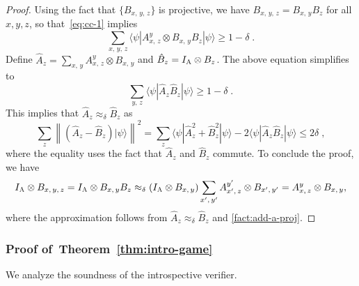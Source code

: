 \documentclass[11pt]{article}
\theoremstyle{definition}
\newcommand{\ket}[1]{|#1\rangle}
\newcommand{\bra}[1]{\langle#1|}
\newcommand{\Id}{\ensuremath{I}}
\newcommand{\ia}{\Id_\alice}
\newcommand{\norm}[1]{\left\| {#1} \right\|}
\newcommand{\labelstyle}[1]{\ensuremath{\textsc{#1}}\xspace}
\newcommand{\alice}{\labelstyle{A}}
\begin{document}
\begin{proof}
  Using the fact that $\{B_{x,\, y,\, z}\}$ is projective, we have $B_{x,\, y,\, z} =
  B_{x,\, y} B_z$ for all $x,y,z$, so that~\eqref{eq:cc-1} implies
  \begin{equation*}
    \sum_{x,\, y,\, z} \bra{\psi} A^y_{x,\, z} \otimes B_{x,\, y} B_{z}
    \ket{\psi} \ge 1 - \delta\;.
  \end{equation*}
  Define $\hat{A}_z = \sum_{x,\, y} A^y_{x,\, z} \otimes B_{x,\, y}$ and
  $\hat{B}_z = \ia \otimes B_z$.
  The above equation simplifies to
  \begin{equation*}
    \sum_{y,\, z} \bra{\psi} \hat{A}_z \hat{B}_z \ket{\psi} \ge 1 - \delta\;.
  \end{equation*}
  This implies that $\hat{A}_z \approx_\delta \hat{B}_z$ as
  \begin{equation*}
    \sum_z \norm{(\hat{A}_z - \hat{B}_z) \ket{\psi}}^2 = \sum_z \bra{\psi}
    \hat{A}_z^2 + \hat{B}_z^2 \ket{\psi} - 2 \bra{\psi} \hat{A}_z \hat{B}_z
    \ket{\psi} \le 2 \delta\;,
  \end{equation*}
  where the equality uses the fact that $\hat{A}_z$ and $\hat{B}_z$ commute.
  To conclude the proof, we have
  \begin{equation*}
    \ia \otimes B_{x,\, y,\, z} = \ia \otimes B_{x,\, y} B_z \approx_\delta (\ia
    \otimes B_{x,\, y}) \sum_{x',\, y'} A^{y'}_{x',\, z} \otimes B_{x',\, y'} =
    A^y_{x,\, z} \otimes B_{x,\, y},
  \end{equation*}
  where the approximation follows from $\hat{A}_z \approx_\delta \hat{B}_z$ and
  \cref{fact:add-a-proj}.

\end{proof}

\subsubsection{Proof of~Theorem~\ref{thm:intro-game}}

We analyze the soundness of the introspective verifier.
\end{document}
